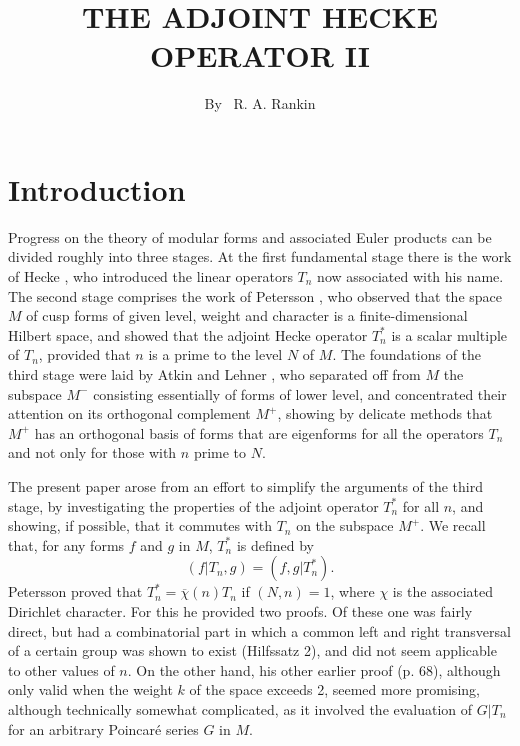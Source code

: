 \title{THE ADJOINT HECKE OPERATOR II}

\author{By~ R. A. Rankin}

\date{}
\maketitle

\setcounter{page}{189} 
\setcounter{pageoriginal}{160}
\section{Introduction}\label{art10-sec1}
\pageoriginale
Progress on the theory of modular forms and associated Euler products can be divided roughly into three stages. At the first fundamental stage there is the work of Hecke \cite{art10-key3}, who introduced the linear operators $T_{n}$ now associated with his name. The second stage comprises the work of Petersson \cite{art10-key8}, who observed that the space $M$ of cusp forms of given level, weight and character is a finite-dimensional Hilbert space, and showed that the adjoint Hecke operator $T^{*}_{n}$ is a scalar multiple of $T_{n}$, provided that $n$ is a prime to the level $N$ of $M$. The foundations of the third stage were laid by Atkin and Lehner \cite{art10-key1}, who separated off from $M$ the subspace $M^{-}$ consisting essentially of forms of lower level, and concentrated their attention on its orthogonal complement $M^{+}$, showing by delicate methods that $M^{+}$ has an orthogonal basis of forms that are eigenforms for all the operators $T_{n}$ and not only for those with $n$ prime to $N$.

The present paper arose from an effort to simplify the arguments of the third stage, by investigating the properties of the adjoint operator $T^{*}_{n}$ for all $n$, and showing, if possible, that it commutes with $T_{n}$ on the subspace $M^{+}$. We recall that, for any forms $f$ and $g$ in $M$, $T^{*}_{n}$ is defined by
\begin{equation}
(f|T_{n},g)=(f,g|T^{*}_{n}).\label{art10-eq1.1}
\end{equation}
Petersson proved that $T^{*}_{n}=\overline{\chi}(n)T_{n}$ if $(N,n)=1$, where $\chi$ is the associated Dirichlet character. For this he provided two proofs. Of these one \cite{art10-key8} was fairly direct, but had a combinatorial part in which a common left and right transversal of a certain group was shown to exist (Hilfssatz 2), and did not seem applicable to other values of $n$. On the other hand, his other earlier proof \cite{art10-key7} (p. 68), although only valid when the weight $k$ of the space exceeds 2, seemed more promising, although technically somewhat complicated, as it involved the evaluation of $G|T_{n}$ for an arbitrary Poincar\'e series $G$ in $M$.


